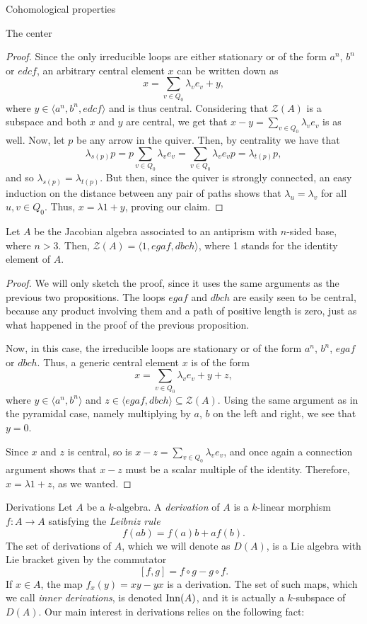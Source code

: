 \begin{chapter}{Cohomological properties}
\begin{section}{The center}
\begin{proof}
Since the only irreducible loops are either stationary or of the form $a^n$, $b^n$ or $edcf$, an arbitrary central element $x$ can be written down as 
\[x = \sum_{v\in Q_0} \lambda_v e_v + y,\]
where $y\in \langle a^n,b^n, edcf\rangle$ and is thus central. Considering that $\mathcal{Z}(A)$ is a subspace and both $x$ and $y$ are central, we get that $x-y=\sum_{v\in Q_0} \lambda_v e_v$ is as well. Now, let $p$ be any arrow in the quiver. Then, by centrality we have that
\[\lambda_{s(p)}p= p\sum_{v\in Q_0} \lambda_v e_v=\sum_{v\in Q_0} \lambda_v e_vp = \lambda_{t(p)}p,\]
and so $\lambda_{s(p)}=\lambda_{t(p)}$. But then, since the quiver is strongly connected, an easy induction on the distance between any pair of paths shows that $\lambda_u=\lambda_v$ for all $u,v\in Q_0$. Thus, $x= \lambda 1 +y$, proving our claim.
\end{proof}

\begin{prop} Let $A$ be the Jacobian algebra associated to an antiprism with $n$-sided base, where $n>3$. Then, $\mathcal{Z}(A) = \langle 1, egaf, dbch\rangle$, where 1 stands for the identity element of $A$.
\end{prop}
\begin{proof} We will only sketch the proof, since it uses the same arguments as the previous two propositions. The loops $egaf$ and $dbch$ are easily seen to be central, because any product involving them and a path of positive length is zero, just as what happened in the proof of the previous proposition.

Now, in this case, the irreducible loops are stationary or of the form $a^n$, $b^n$, $egaf$ or $dbch$. Thus, a generic central element $x$ is of the form
\[x = \sum_{v\in Q_0} \lambda_v e_v + y + z,\]
where $y\in\langle a^n, b^n\rangle$ and $z\in\langle egaf, dbch\rangle\subseteq \mathcal{Z}(A)$. Using the same argument as in the pyramidal case, namely multiplying by $a$, $b$ on the left and right, we see that $y=0$.

Since $x$ and $z$ is central, so is $x-z= \sum_{v\in Q_0} \lambda_v e_v$, and once again a connection argument shows that $x-z$ must be a scalar multiple of the identity. Therefore, $x=\lambda 1 + z$, as we wanted.
\end{proof}
\end{section}

\begin{section}{Derivations}
Let $A$ be a $k$-algebra. A \emph{derivation} of $A$ is a $k$-linear morphism $f:A\to A$ satisfying the \emph{Leibniz rule}
\[f(ab)=f(a)b+af(b).\]
The set of derivations of $A$, which we will denote as $D(A)$, is a Lie algebra with Lie bracket given by the commutator
\[[f,g] = f\circ g - g\circ f.\]
If $x\in A$, the map $f_x(y) = xy-yx$ is a derivation. The set of such maps, which we call \emph{inner derivations}, is denoted $\operatorname{Inn}(A)$, and it is actually a $k$-subspace of $D(A)$. Our main interest in derivations relies on the following fact:


\end{section}
\end{chapter}
